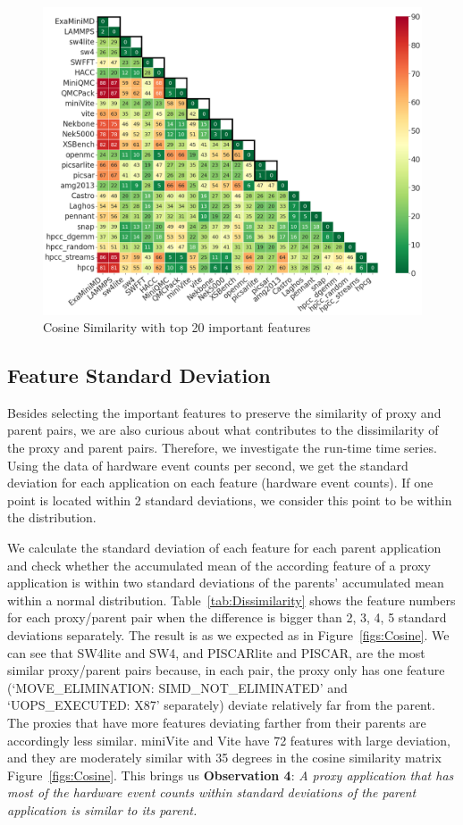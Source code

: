 \begin{figure}[ht]
\centering
\includegraphics[width=\linewidth]{figs/top20cosine_origin_color_font20.png}
\caption{Cosine Similarity with top 20 important features}
\label{figs:top20Cosine}
\end{figure}

\subsection{Feature Standard Deviation}
\label{sec:Dev}
Besides selecting the important features to preserve the similarity of proxy and parent pairs, we are also curious about what contributes to the dissimilarity of the proxy and parent pairs. Therefore, we investigate the run-time time series. Using the data of hardware event counts per second, we get the standard deviation for each application on each feature (hardware event counts). If one point is located within 2 standard deviations, we consider this point to be within the distribution.


We calculate the standard deviation of each feature for each parent application and check whether the accumulated mean of the according feature of a proxy application is within two standard deviations of the parents' accumulated mean within a normal distribution. 
Table~\ref{tab:Dissimilarity} shows the feature numbers for each proxy/parent pair when the difference is bigger than 2, 3, 4, 5 standard deviations separately. The result is as we expected as in Figure~\ref{figs:Cosine}. We can see that SW4lite and SW4, and PISCARlite and PISCAR, are the most similar proxy/parent pairs because, in each pair, the proxy only has one feature (`MOVE\_ELIMINATION: SIMD\_NOT\_ELIMINATED' and `UOPS\_EXECUTED: X87' separately) deviate relatively far from the parent. The proxies that have more features deviating farther from their parents are accordingly less similar. \eg miniVite and Vite have 72 features with large deviation, and they are moderately similar with 35 degrees in the cosine similarity matrix Figure~\ref{figs:Cosine}. This 
brings us \textbf{Observation 4}: \textit{A proxy application that has most of the hardware event counts within standard deviations of the parent application is similar to its parent.} 



